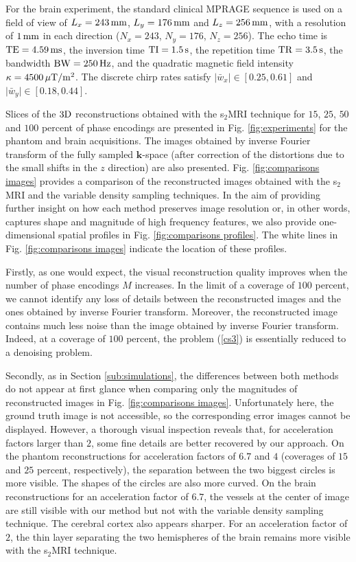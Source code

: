 \documentclass[10pt,draftcls, onecolumn]{IEEEtran}
\begin{document}
For the brain experiment, the standard clinical MPRAGE sequence is used on a field of view of $L_x = 243\,\rm{mm}$, $L_y = 176\,\rm{mm}$ and $L_z = 256\,\rm{mm}$, with a resolution of $1\,\rm{mm}$ in each direction ($N_x = 243$, $N_y = 176$, $N_z = 256$). The echo time is $\rm{TE} = 4.59\,\rm{ms}$, the inversion time $\rm{TI} = 1.5\,\rm{s}$, the repetition time $\rm{TR} = 3.5\,\rm{s}$, the bandwidth $\rm{BW} = 250\,\rm{Hz}$, and the quadratic magnetic field intensity $\kappa = 4 500\,\rm{\mu T/m^{2}}$. The discrete chirp rates satisfy $\vert \bar{w}_x \vert \in [0.25, 0.61]$ and $\vert \bar{w}_y \vert \in [0.18, 0.44]$.

Slices of the $3\rm{D}$ reconstructions obtained with the s$_2$MRI technique for $15$, $25$, $50$ and $100$ percent of phase encodings are presented in Fig. \ref{fig:experiments} for the phantom and brain acquisitions. The images obtained by inverse Fourier transform of the fully sampled $\bm{k}$-space (after correction of the distortions due to the small shifts in the $z$ direction) are also presented. Fig. \ref{fig:comparisons images} provides a comparison of the reconstructed images obtained with the s$_2$MRI and the variable density sampling techniques. In the aim of providing further insight on how each method preserves image resolution or, in other words, captures shape and magnitude of high frequency features, we also provide one-dimensional spatial profiles in Fig. \ref{fig:comparisons profiles}. The white lines in Fig. \ref{fig:comparisons images} indicate the location of these profiles.

Firstly, as one would expect, the visual reconstruction quality improves when the number of phase encodings $M$ increases. In the limit of a coverage of $100$ percent, we cannot identify any loss of details between the reconstructed images and the ones obtained by inverse Fourier transform. Moreover, the reconstructed image contains much less noise than the image obtained by inverse Fourier transform. Indeed, at a coverage of $100$ percent, the problem (\ref{cs3}) is essentially reduced to a denoising problem.

Secondly, as in Section \ref{sub:simulations}, the differences between both methods do not appear at first glance when comparing only the magnitudes of reconstructed images in Fig. \ref{fig:comparisons images}. Unfortunately here, the ground truth image is not accessible, so the corresponding error images cannot be displayed. However, a thorough visual inspection reveals that, for acceleration factors larger than $2$, some fine details are better recovered by our approach. On the phantom reconstructions for acceleration factors of $6.7$ and $4$ (coverages of $15$ and $25$ percent, respectively), the separation between the two biggest circles is more visible. The shapes of the circles are also more curved. On the brain reconstructions for an acceleration factor of $6.7$, the vessels at the center of image are still visible with our method but not with the variable density sampling technique. The cerebral cortex also appears sharper. For an acceleration factor of $2$, the thin layer separating the two hemispheres of the brain remains more visible with the s$_2$MRI technique.
\end{document}
